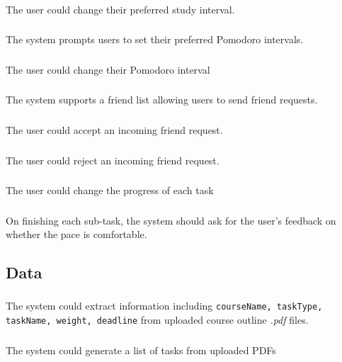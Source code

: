 \documentclass[12pt]{article}
\begin{document}
\subsubsection{}
The user could change their preferred study interval.
\subsubsection{}
The system prompts users to set their preferred Pomodoro intervals. 
\subsubsection{}
The user could change their Pomodoro interval
\subsubsection{}
The system supports a friend list allowing users to send friend requests.
\subsubsection{}
The user could accept an incoming friend request.
\subsubsection{}
The user could reject an incoming friend request.
\subsubsection{}
The user could change the progress of each task
\subsubsection{}
On finishing each sub-task, the system should ask for the user's feedback on whether the pace is comfortable.


\subsection{Data}
\subsubsection{}
The system could extract information including \texttt{courseName, taskType, taskName, weight, deadline} from uploaded course outline \textit{.pdf} files.
\subsubsection{}
The system could generate a list of tasks from uploaded PDFs 
\end{document}
